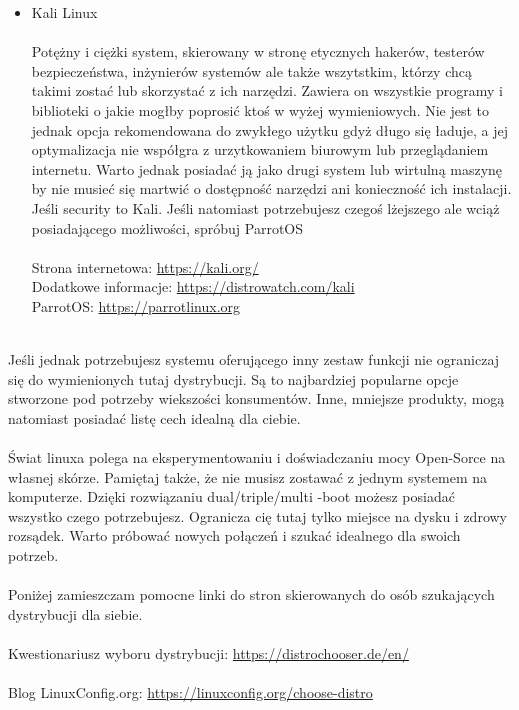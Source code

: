 \documentclass[10pt,a4paper]{report}
\begin{document}
\begin{itemize}
\item {\Huge Kali Linux \\\\}Potężny i ciężki system, skierowany w stronę etycznych hakerów, testerów bezpieczeństwa, inżynierów systemów ale także wszytstkim, którzy chcą takimi zostać lub skorzystać z ich narzędzi. Zawiera on wszystkie programy i biblioteki o jakie mogłby poprosić ktoś w wyżej wymieniowych. Nie jest to jednak opcja rekomendowana do zwykłego użytku gdyż długo się ładuje, a jej optymalizacja nie współgra z urzytkowaniem biurowym lub przeglądaniem internetu. Warto jednak posiadać ją jako drugi system lub wirtulną maszynę by nie musieć się martwić o dostępność narzędzi ani konieczność ich instalacji. Jeśli security to Kali. Jeśli natomiast potrzebujesz czegoś lżejszego ale wciąż posiadającego możliwości, spróbuj ParrotOS\\\\Strona internetowa: \url{https://kali.org/}\\ Dodatkowe informacje: \href{https://distrowatch.com/table.php?distribution=kali}{https://distrowatch.com/kali}\\ParrotOS: \url{https://parrotlinux.org}\\\\
\end{itemize}

Jeśli jednak potrzebujesz systemu oferującego inny zestaw funkcji nie ograniczaj się do wymienionych tutaj dystrybucji. Są to najbardziej popularne opcje stworzone pod potrzeby wiekszości konsumentów. Inne, mniejsze produkty, mogą natomiast posiadać listę cech idealną dla ciebie. \\\\Świat linuxa polega na eksperymentowaniu i doświadczaniu mocy Open-Sorce na własnej skórze. Pamiętaj także, że nie musisz zostawać z jednym systemem na komputerze. Dzięki rozwiązaniu dual/triple/multi -boot możesz posiadać wszystko czego potrzebujesz. Ogranicza cię tutaj tylko miejsce na dysku i zdrowy rozsądek. Warto próbować nowych połączeń i szukać idealnego dla swoich potrzeb.\\\\ Poniżej zamieszczam pomocne linki do stron skierowanych do osób szukających dystrybucji dla siebie.\\\\Kwestionariusz wyboru dystrybucji: \url{https://distrochooser.de/en/}\\\\Blog LinuxConfig.org:  \href{https://linuxconfig.org/how-to-choose-the-best-linux-distro}{https://linuxconfig.org/choose-distro}
	
\end{document}
